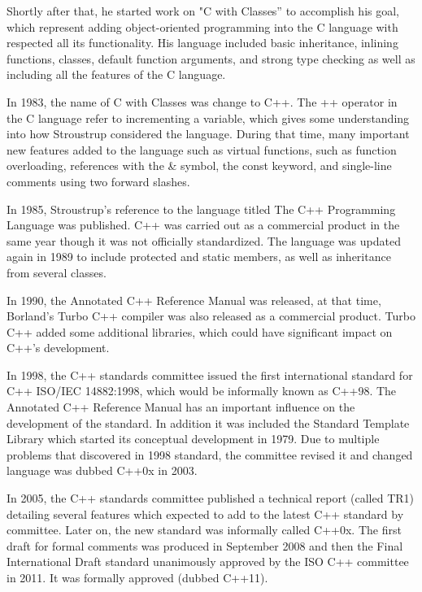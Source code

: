 \documentclass[11pt,]{report}
\begin{document}
Shortly after that, he started work on "C with Classes” to accomplish his goal, which represent adding object-oriented programming into the C language with respected all its functionality. His language included basic inheritance, inlining functions, classes, default function arguments, and strong type checking as well as including all the features of the C language\cite{StroustrupHistory}.

In 1983, the name of C with Classes was change to C++. \linebreak The ++ operator in the C language refer to incrementing a variable, which gives some understanding into how Stroustrup considered the language.  \linebreak During that time, many important new features added to the language such as  virtual functions, such as function overloading, references with the \& symbol, the const keyword, and single-line comments using two forward slashes\cite{StroustrupHistory}.

In 1985, Stroustrup's reference to the language titled The C++ \linebreak Programming Language was published. C++ was carried out as a \linebreak commercial product in the same year though it was not officially \linebreak standardized. The language was updated again in 1989 to include protected and static members, as well as inheritance from several classes\cite{StroustrupHistory}.

In 1990, the Annotated C++ Reference Manual was released, at that time, Borland's Turbo C++ compiler was also released as a commercial product. Turbo C++ added some additional libraries, which could have significant \linebreak impact on C++'s development\cite{StroustrupHistory}.

In 1998, the C++ standards committee issued the first international \linebreak standard for C++ ISO/IEC 14882:1998, which would be informally known as C++98. The Annotated C++ Reference Manual has an important influence on the development of the standard.  In addition it was included the Standard Template Library which started its conceptual development in 1979. Due to multiple problems that discovered in 1998 standard, the committee revised it and changed language was dubbed C++0x in 2003\cite{CplusplusHistoryofCpp}.

In 2005, the C++ standards committee published a technical report (called TR1) detailing several features which expected to add to the latest C++ \linebreak standard by committee. Later on, the new standard was informally called C++0x.  The first draft for formal comments was produced in September 2008 and then the Final International Draft standard unanimously approved by the ISO C++ committee in 2011. It was formally approved (dubbed C++11)\cite{CplusplusHistoryofCpp}.
\end{document}
